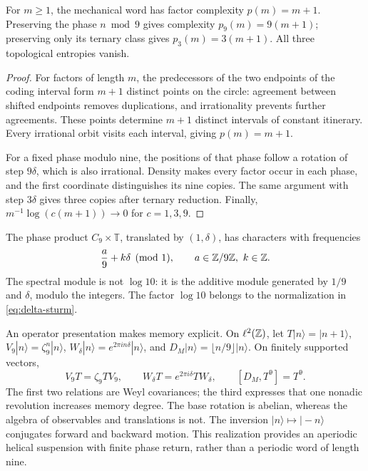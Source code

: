 \begin{theorem}
For \(m\ge1\), the mechanical word has factor complexity \(p(m)=m+1\). Preserving the phase \(n\bmod9\) gives complexity \(p_9(m)=9(m+1)\); preserving only its ternary class gives \(p_3(m)=3(m+1)\). All three topological entropies vanish.
\end{theorem}
\begin{proof}
For factors of length \(m\), the predecessors of the two endpoints of the coding interval form \(m+1\) distinct points on the circle: agreement between shifted endpoints removes duplications, and irrationality prevents further agreements. These points determine \(m+1\) distinct intervals of constant itinerary. Every irrational orbit visits each interval, giving \(p(m)=m+1\).

For a fixed phase modulo nine, the positions of that phase follow a rotation of step \(9\delta\), which is also irrational. Density makes every factor occur in each phase, and the first coordinate distinguishes its nine copies. The same argument with step \(3\delta\) gives three copies after ternary reduction. Finally, \(m^{-1}\log(c(m+1))\to0\) for \(c=1,3,9\).
\end{proof}

The phase product \(C_9\times\mathbb T\), translated by \((1,\delta)\), has characters with frequencies
\[
 \frac a9+k\delta\pmod1,\qquad a\in\mathbb Z/9\mathbb Z,\ k\in\mathbb Z.
\]
The spectral module is not \(\log10\): it is the additive module generated by \(1/9\) and \(\delta\), modulo the integers. The factor \(\log10\) belongs to the normalization in \eqref{eq:delta-sturm}.

An operator presentation makes memory explicit. On \(\ell^2(\mathbb Z)\), let \(T|n\rangle=|n+1\rangle\), \(V_9|n\rangle=\zeta_9^n|n\rangle\), \(W_\delta|n\rangle=e^{2\pi i n\delta}|n\rangle\), and \(D_M|n\rangle=\lfloor n/9\rfloor|n\rangle\). On finitely supported vectors,
\begin{equation}
 V_9T=\zeta_9TV_9,\qquad
 W_\delta T=e^{2\pi i\delta}TW_\delta,\qquad
 [D_M,T^9]=T^9.
 \label{eq:weyl-relojes}
\end{equation}
The first two relations are Weyl covariances; the third expresses that one nonadic revolution increases memory degree. The base rotation is abelian, whereas the algebra of observables and translations is not. The inversion \(|n\rangle\mapsto|-n\rangle\) conjugates forward and backward motion. This realization provides an aperiodic helical suspension with finite phase return, rather than a periodic word of length nine.

